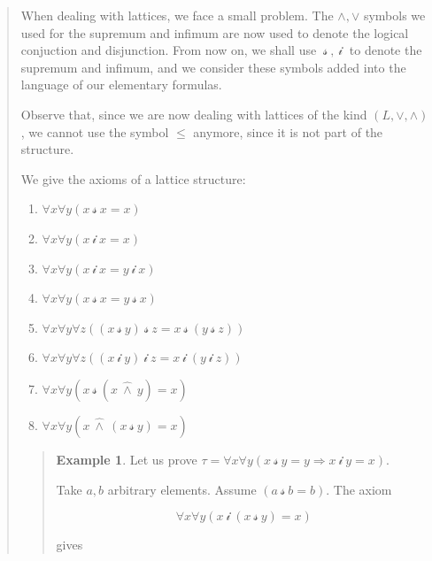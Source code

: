 \documentclass[a4paper, 12pt]{article}
\theoremstyle{definition}
\theoremstyle{definition}
\newtheorem{example}{Example}
\theoremstyle{definition}
\begin{document}
\begin{quote}
When dealing with lattices, we face a small problem. The $\land , \lor $
symbols we used for the supremum and infimum are now used to denote the logical
conjuction and disjunction. From now on, we shall use $~\mathcal{s}~,
~\mathcal{i}~$ to denote the supremum and infimum, and we consider these 
symbols added into the language of our elementary formulas. 

Observe that, since we are now dealing with lattices of the kind $(L, \lor,
\land)$, we cannot use the symbol $\leq$ anymore, since it is not part of the
structure.

We give the axioms of a lattice structure: 

\begin{enumerate}
    \item $\forall x \forall  y \left( x ~\mathcal{s}~ x = x \right) $
    \item $\forall x \forall  y \left( x ~\mathcal{i}~ x = x \right) $
    \item $\forall x \forall  y \left( x ~\mathcal{i}~ x = y ~\mathcal{i}~ x \right) $
    \item $\forall x \forall  y \left( x ~\mathcal{s}~ x = y ~\mathcal{s}~ x \right) $
    \item $\forall x \forall  y \forall z\left( (x ~\mathcal{s}~y) ~\mathcal{s}~z = x ~\mathcal{s}~(y ~\mathcal{s}~z) \right) $
    \item $\forall x \forall  y \forall z\left( (x ~\mathcal{i}~y) ~\mathcal{i}~z = x ~\mathcal{i}~(y ~\mathcal{i}~z) \right) $
    \item $\forall x \forall  y \left( x ~\mathcal{s}~(x ~\hat{\land }~y) = x \right) $
    \item $\forall x \forall  y \left( x ~\hat{\land }~(x ~\mathcal{s}~y) = x \right) $
\end{enumerate}


\small
\begin{quote}

\begin{example}
    Let us prove $\tau = \forall x \forall y \left( x ~\mathcal{s}~y = y \Rightarrow x ~\mathcal{i}~ y = x \right) $. 

    Take $a, b$ arbitrary elements. Assume $(a ~\mathcal{s}~b = b)$. The axiom 

    \begin{equation*}
        \forall x \forall y (x ~\mathcal{i}~ (x ~\mathcal{s}~ y) = x)
    \end{equation*}

    gives 


\end{example}
\end{quote}
\end{quote}
\end{document}
